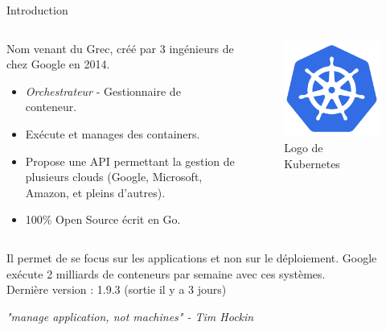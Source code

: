 \documentclass{bredelebeamer}
\begin{document}
\begin{frame}{Introduction}
\begin{columns}
\begin{column}{0.5\textwidth}

Nom venant du Grec, créé par 3 ingénieurs de chez Google en 2014.
\begin{itemize}
\item \textit{Orchestrateur} - Gestionnaire de conteneur.
\item Exécute et manages des containers.
\item Propose une API permettant la gestion de plusieurs clouds (Google, Microsoft, Amazon, et pleins d'autres).
\item 100\% Open Source écrit en Go.
\end{itemize}


\end{column}
\begin{column}{0.5\textwidth}


\begin{figure}
\centering
\includegraphics[scale=0.15]{images/img1.png}
\caption{Logo de Kubernetes}
\end{figure}

\end{column}
\end{columns}

\vspace{10px}
Il permet de se focus sur les applications et non sur le déploiement.  
Google exécute 2 milliards de conteneurs par semaine avec ces systèmes.\\\pause
\vspace{10px}
Dernière version : 1.9.3 (sortie il y a 3 jours) \\ \pause

\vspace{10px}
\begin{center}
\textit{"manage application, not machines" - Tim Hockin}
\end{center}

\end{frame}
\end{document}
